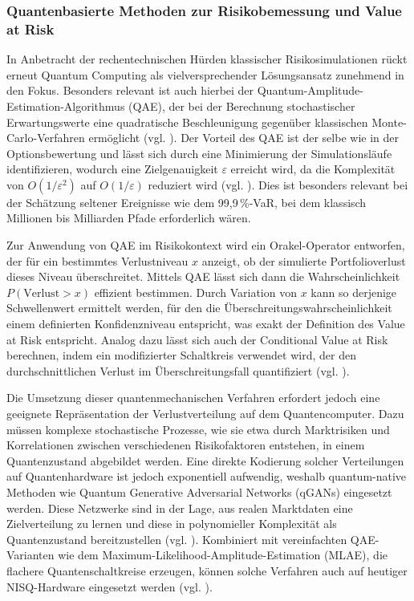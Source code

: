 \subsubsection*{Quantenbasierte Methoden zur Risikobemessung und Value at Risk}

In Anbetracht der rechentechnischen Hürden klassischer Risikosimulationen rückt erneut Quantum Computing als vielversprechender Lösungsansatz zunehmend in den Fokus. Besonders relevant ist auch hierbei der Quantum-Amplitude-Estimation-Algorithmus (QAE), der bei der Berechnung stochastischer Erwartungswerte eine quadratische Beschleunigung gegenüber klassischen Monte-Carlo-Verfahren ermöglicht (vgl. \cite{quantumjournal2020, rebentrost_quantum_2018}). Der Vorteil des QAE ist der selbe wie in der Optionsbewertung und lässt sich durch eine Minimierung der Simulationsläufe identifizieren, wodurch eine Zielgenauigkeit $\varepsilon$ erreicht wird, da die Komplexität von $O(1/\varepsilon^2)$ auf $O(1/\varepsilon)$ reduziert wird (vgl. \cite{martin2022}). Dies ist besonders relevant bei der Schätzung seltener Ereignisse wie dem 99{,}9\,\%-VaR, bei dem klassisch Millionen bis Milliarden Pfade erforderlich wären.

Zur Anwendung von QAE im Risikokontext wird ein Orakel-Operator entworfen, der für ein bestimmtes Verlustniveau $x$ anzeigt, ob der simulierte Portfolioverlust dieses Niveau überschreitet. Mittels QAE lässt sich dann die Wahrscheinlichkeit $P(\text{Verlust} > x)$ effizient bestimmen. Durch Variation von $x$ kann so derjenige Schwellenwert ermittelt werden, für den die Überschreitungswahrscheinlichkeit einem definierten Konfidenzniveau entspricht, was exakt der Definition des Value at Risk entspricht. Analog dazu lässt sich auch der Conditional Value at Risk berechnen, indem ein modifizierter Schaltkreis verwendet wird, der den durchschnittlichen Verlust im Überschreitungsfall quantifiziert (vgl. \cite{orus_quantum_2019, egger_quantum_2020}).

Die Umsetzung dieser quantenmechanischen Verfahren erfordert jedoch eine geeignete Repräsentation der Verlustverteilung auf dem Quantencomputer. Dazu müssen komplexe stochastische Prozesse, wie sie etwa durch Marktrisiken und Korrelationen zwischen verschiedenen Risikofaktoren entstehen, in einem Quantenzustand abgebildet werden. Eine direkte Kodierung solcher Verteilungen auf Quantenhardware ist jedoch exponentiell aufwendig, weshalb quantum-native Methoden wie Quantum Generative Adversarial Networks (qGANs) eingesetzt werden. Diese Netzwerke sind in der Lage, aus realen Marktdaten eine Zielverteilung zu lernen und diese in polynomieller Komplexität als Quantenzustand bereitzustellen (vgl. \cite{zoufal_quantum_2019}). Kombiniert mit vereinfachten QAE-Varianten wie dem Maximum-Likelihood-Amplitude-Estimation (MLAE), die flachere Quantenschaltkreise erzeugen, können solche Verfahren auch auf heutiger NISQ-Hardware eingesetzt werden (vgl. \cite{stamatopoulos_option_2020}).

